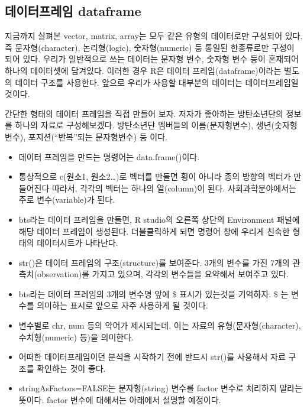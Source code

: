 \documentclass[
]{book}
\providecommand{\tightlist}{%
  \setlength{\itemsep}{0pt}\setlength{\parskip}{0pt}}
\theoremstyle{definition}
\theoremstyle{definition}
\theoremstyle{definition}
\theoremstyle{definition}
\theoremstyle{remark}
\begin{document}
\hypertarget{uxb370uxc774uxd130uxd504uxb808uxc784-dataframe}{%
\subsection{데이터프레임 dataframe}\label{uxb370uxc774uxd130uxd504uxb808uxc784-dataframe}}

지금까지 살펴본 vector, matrix, array는 모두 같은 유형의 데이터로만 구성되어 있다. 즉 문자형(character), 논리형(logic), 숫자형(numeric) 등 통일된 한종류로만 구성이 되어 있다. 우리가 일반적으로 쓰는 데이터는 문자형 변수, 숫자형 변수 등이 혼재되어 하나의 데이터셋에 담겨있다. 이러한 경우 R은 데이터 프레임(dataframe)이라는 별도의 데이터 구조를 사용한다. 앞으로 우리가 사용할 대부분의 데이터는 데이터프레임일 것이다.

간단한 형태의 데이터 프레임을 직접 만들어 보자. 저자가 좋아하는 방탄소년단의 정보를 하나의 자료로 구성해보겠다. 방탄소년단 멤버들의 이름(문자형변수), 생년(숫자형 변수), 포지션(``반복''되는 문자형변수) 등 이다.

\begin{itemize}
\tightlist
\item
  데이터 프레임을 만드는 명령어는 data.frame()이다.
\item
  통상적으로 c(원소1, 원소2\ldots)로 벡터를 만들면 횡이 아니라 종의 방향의 벡터가 만들어진다 따라서, 각각의 벡터는 하나의 열(column)이 된다. 사회과학분야에서는 주로 변수(variable)가 된다.
\item
  bts라는 데이터 프레임을 만들면, R studio의 오른쪽 상단의 Environment 패널에 해당 데이터 프레임이 생성된다. 더블클릭하게 되면 명령어 창에 우리게 친숙한 형태의 데이터시트가 나타난다.
\item
  str()은 데이터 프레임의 구조(structure)를 보여준다. 3개의 변수를 가진 7개의 관측치(observation)를 가지고 있으며, 각각의 변수들을 요약해서 보여주고 있다.
\item
  bts라는 데이터 프레임의 3개의 변수명 앞에 \$ 표시가 있는것을 기억하자. \$ 는 변수를 의미하는 표시로 앞으로 자주 사용하게 될 것이다.
\item
  변수별로 chr, num 등의 약어가 제시되는데, 이는 자료의 유형(문자형(character), 수치형(numeric) 등)을 의미한다.
\item
  어떠한 데이터프레임이던 분석을 시작하기 전에 반드시 str()를 사용해서 자료 구조를 확인하는 것이 좋다.
\item
  stringAsFactors=FALSE는 문자형(string) 변수를 factor 변수로 처리하지 말라는 뜻이다. factor 변수에 대해서는 아래에서 설명할 예정이다.
\end{itemize}
\end{document}
